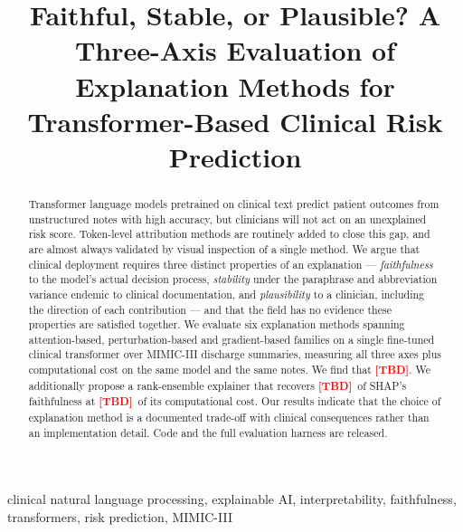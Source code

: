 \documentclass[conference]{IEEEtran}
\newif\ifdraftnums\draftnumstrue   %
\newcommand{\TBD}{\ifdraftnums\textcolor{red}{\textbf{[TBD]}}\else--\fi}
\newcommand{\ph}[1]{\ifdraftnums\textcolor{red}{#1}\else#1\fi}
\begin{document}
\title{Faithful, Stable, or Plausible? A Three-Axis Evaluation of\\
Explanation Methods for Transformer-Based Clinical Risk Prediction}

\author{
\IEEEauthorblockA{\textit{\ph{Department}} \\
\textit{\ph{Institution}}\\
\ph{City, Country} \\
anwesha.dash3010@gmail.com}
\and
\IEEEauthorblockN{\ph{Co-author / Supervisor}}
\IEEEauthorblockA{\textit{\ph{Department}} \\
\textit{\ph{Institution}}\\
\ph{City, Country} \\
\ph{email}}
}

\maketitle

\begin{abstract}
Transformer language models pretrained on clinical text predict patient outcomes
from unstructured notes with high accuracy, but clinicians will not act on an
unexplained risk score. Token-level attribution methods are routinely added to
close this gap, and are almost always validated by visual inspection of a single
method. We argue that clinical deployment requires three distinct properties of
an explanation --- \emph{faithfulness} to the model's actual decision process,
\emph{stability} under the paraphrase and abbreviation variance endemic to
clinical documentation, and \emph{plausibility} to a clinician, including the
direction of each contribution --- and that the field has no evidence these
properties are satisfied together. We evaluate six explanation methods spanning
attention-based, perturbation-based and gradient-based families on a single
fine-tuned clinical transformer over MIMIC-III discharge summaries, measuring all
three axes plus computational cost on the same model and the same notes. We find
that \TBD. We additionally propose a rank-ensemble explainer that recovers \TBD\
of SHAP's faithfulness at \TBD\ of its computational cost. Our results indicate
that the choice of explanation method is a documented trade-off with clinical
consequences rather than an implementation detail. Code and the full evaluation
harness are released.
\end{abstract}

\begin{IEEEkeywords}
clinical natural language processing, explainable AI, interpretability,
faithfulness, transformers, risk prediction, MIMIC-III
\end{IEEEkeywords}
\end{document}
